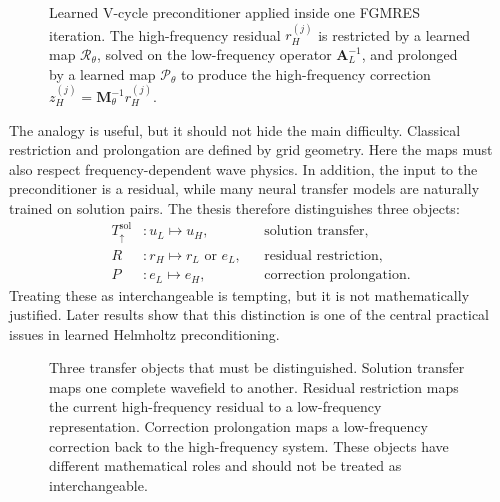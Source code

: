 \begin{figure}[htbp]
    \centering
    \caption{Learned V-cycle preconditioner applied inside one FGMRES
    iteration. The high-frequency residual $r_H^{(j)}$ is restricted by a
    learned map $\mathcal{R}_{\theta}$, solved on the low-frequency operator
    $\mathbf{A}_L^{-1}$, and prolonged by a learned map
    $\mathcal{P}_{\theta}$ to produce the high-frequency correction
    $z_H^{(j)}=\mathbf{M}_{\theta}^{-1}r_H^{(j)}$.}
    \label{fig:ch5-learned-vcycle-schematic}
\end{figure}

The analogy is useful, but it should not hide the main difficulty. Classical
restriction and prolongation are defined by grid geometry. Here the maps must
also respect frequency-dependent wave physics. In addition, the input to the
preconditioner is a residual, while many neural transfer models are naturally
trained on solution pairs. The thesis therefore distinguishes three objects:
\begin{align}
    T_{\uparrow}^{\mathrm{sol}} &: u_L \mapsto u_H,
    &&\text{solution transfer}, \label{eq:ch5-three-operators-a}\\
    R &: r_H \mapsto r_L \text{ or } e_L,
    &&\text{residual restriction}, \label{eq:ch5-three-operators-b}\\
    P &: e_L \mapsto e_H,
    &&\text{correction prolongation}. \label{eq:ch5-three-operators-c}
\end{align}
Treating these as interchangeable is tempting, but it is not mathematically
justified. Later results show that this distinction is one of the central
practical issues in learned Helmholtz preconditioning.

\begin{figure}[htbp]
    \centering
    \caption{Three transfer objects that must be distinguished. Solution
    transfer maps one complete wavefield to another. Residual restriction maps
    the current high-frequency residual to a low-frequency representation.
    Correction prolongation maps a low-frequency correction back to the
    high-frequency system. These objects have different mathematical roles and
    should not be treated as interchangeable.}
    \label{fig:ch5-three-transfer-objects}
\end{figure}

